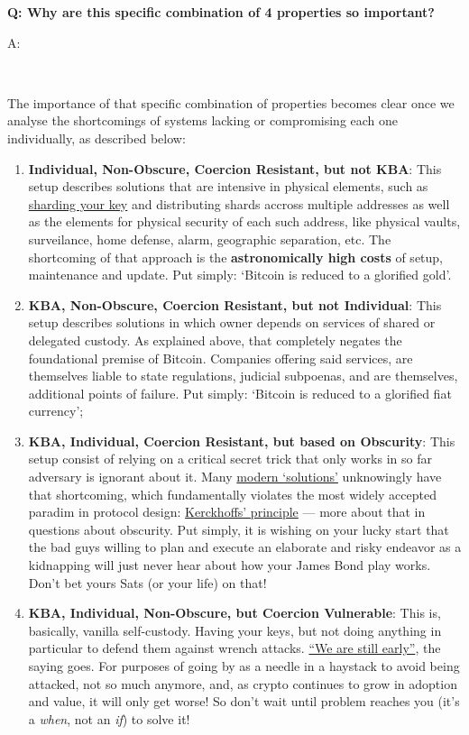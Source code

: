 \documentclass[12pt,a4paper]{article}
\newenvironment{question}[1]{%
  \vspace{0.8em}\noindent\textbf{Q: #1}\par
  \vspace{0.2em}\noindent\begin{itshape}A:\end{itshape}~%
}{\vspace{0.8em}}
\newcommand{\kprinciple}{https://en.wikipedia.org/wiki/Kerckhoffs's_principle}
\begin{document}
\begin{question}{Why are this specific combination of 4 properties so important?}
 The importance of that specific combination of properties becomes clear once we analyse the shortcomings of systems lacking or compromising each one individually, as described below:
 \begin{enumerate}
  \item \textbf{Individual, Non-Obscure, Coercion Resistant, but not KBA}: This setup describes solutions that are intensive in physical elements, such as \href{https://iancoleman.io/shamir39/}{sharding your key} and distributing shards accross multiple addresses as well as the elements for physical security of each such address, like physical vaults, surveilance, home defense, alarm, geographic separation, etc. The shortcoming of that approach is the \textbf{astronomically high costs} of setup, maintenance and update. Put simply: `Bitcoin is reduced to a glorified gold'.
  \item \textbf{KBA, Non-Obscure, Coercion Resistant, but not Individual}: This setup describes solutions in which owner depends on services of shared or delegated custody. As explained above, that completely negates the foundational premise of Bitcoin. Companies offering said services, are themselves liable to state regulations, judicial subpoenas, and are themselves, additional points of failure. Put simply: `Bitcoin is reduced to a glorified fiat currency';
  \item \textbf{KBA, Individual, Coercion Resistant, but based on Obscurity}: This setup consist of relying on a critical secret trick that only works in so far adversary is ignorant about it. Many \href{https://rewindbitcoin.com/}{modern `solutions'} unknowingly have that shortcoming, which fundamentally violates the most widely accepted paradim in protocol design: \href{\kprinciple}{Kerckhoffs' principle} --- more about that in questions about obscurity. Put simply, it is wishing on your lucky start that the bad guys willing to plan and execute an elaborate and risky endeavor as a kidnapping will just never hear about how your James Bond play works. Don't bet yours Sats (or your life) on that!
  \item \textbf{KBA, Individual, Non-Obscure, but Coercion Vulnerable}: This is, basically, vanilla self-custody. Having your keys, but not doing anything in particular to defend them against wrench attacks. \href{https://duckduckgo.com/?q=\%22we+are+still+early\%22+bitcoin&t=brave&ia=web}{``We are still early''}, the saying goes. For purposes of going by as a needle in a haystack to avoid being attacked, not so much anymore, and, as crypto continues to grow in adoption and value, it will only get worse! So don't wait until problem reaches you (it's a \textit{when}, not an \textit{if}) to solve it!

\end{enumerate}
\end{question}
\end{document}
